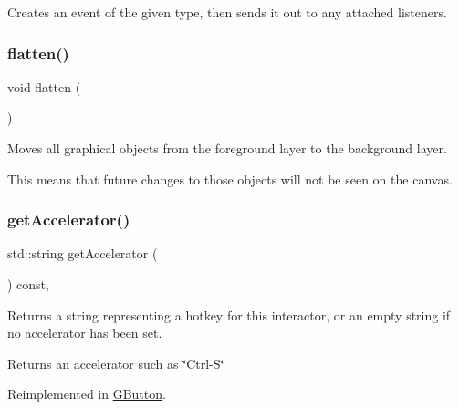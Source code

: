 Creates an event of the given type, then sends it out to any attached listeners. 

\mbox{\label{classsgl_1_1GCanvas_a4c4590df33ce47ad8a42e06f9f44fc93}} 
\subsubsection{\texorpdfstring{flatten()}{flatten()}}
{\footnotesize\ttfamily void flatten (\begin{DoxyParamCaption}{ }\end{DoxyParamCaption})\hspace{0.3cm}{\ttfamily [virtual]}}



Moves all graphical objects from the foreground layer to the background layer. 

This means that future changes to those objects will not be seen on the canvas. \mbox{\label{classsgl_1_1GInteractor_a69f8d23ed8f207fbecad99960776e942}} 
\subsubsection{\texorpdfstring{get\+Accelerator()}{getAccelerator()}}
{\footnotesize\ttfamily std\+::string get\+Accelerator (\begin{DoxyParamCaption}{ }\end{DoxyParamCaption}) const\hspace{0.3cm}{\ttfamily [virtual]}, {\ttfamily [inherited]}}



Returns a string representing a hotkey for this interactor, or an empty string if no accelerator has been set. 

\begin{DoxyReturn}{Returns}
an accelerator such as \char`\"{}\+Ctrl-\/\+S\char`\"{} 
\end{DoxyReturn}


Reimplemented in \mbox{\hyperlink{classsgl_1_1GButton_a57806dc9defb73f76f493f8548319924}{G\+Button}}.

\mbox{\label{classsgl_1_1GInteractor_a94eb4276000c4fdfb508ce9e6317a82a}} 
